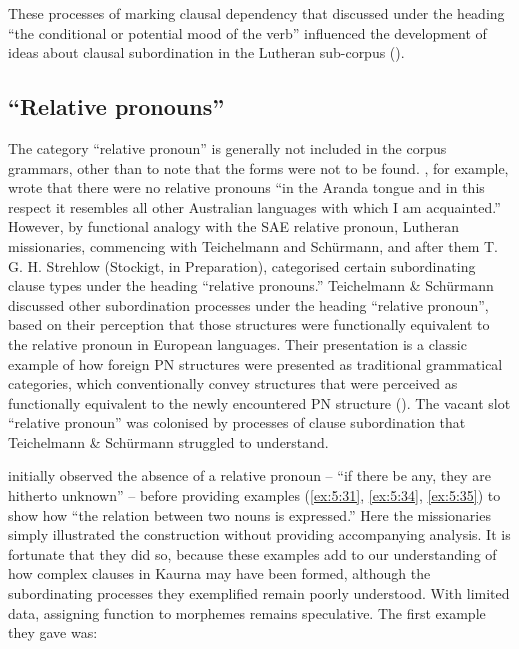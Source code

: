 These processes of marking clausal dependency that \citet{teichelmann_outlines_1840} discussed under the heading “the conditional or potential mood of the verb” influenced the development of ideas about clausal subordination in the Lutheran sub-corpus ().

\subsection{``Relative pronouns''}
\label{sec:key:5.6.3}

The category “relative pronoun” is generally not included in the corpus grammars, other than to note that the forms were not to be found. \citet[327]{mathews_arranda_1907}, for example, wrote that there were no relative pronouns “in the Aranda tongue and in this respect it resembles all other Australian languages with which I am acquainted.” However, by functional analogy with the SAE relative pronoun, Lutheran missionaries, commencing with Teichelmann and Schürmann, and after them T. G. H. Strehlow (Stockigt, in Preparation), categorised certain subordinating clause types under the heading “relative pronouns.” 
Teichelmann \& Schürmann discussed other subordination processes under the heading ``relative pronoun'', based on their perception that those structures were functionally equivalent to the relative pronoun in European languages. Their presentation is a classic example of how foreign PN structures were presented as traditional grammatical categories, which conventionally convey structures that were perceived as functionally equivalent to the newly encountered PN structure (). The vacant slot “relative pronoun” was colonised by processes of clause subordination that Teichelmann \& Schürmann struggled to understand.

\citet[13]{teichelmann_outlines_1840} initially observed the absence of a relative pronoun – “if there be any, they are hitherto unknown” – before providing examples (\ref{ex:5:31}, \ref{ex:5:34}, \ref{ex:5:35}) to show how “the relation between two nouns is expressed.” Here the missionaries simply illustrated the construction without providing accompanying analysis. It is fortunate that they did so, because these examples add to our understanding of how complex clauses in Kaurna may have been formed, although the subordinating processes they exemplified remain poorly understood. With limited data, assigning function to morphemes remains speculative. The first example they gave was:

